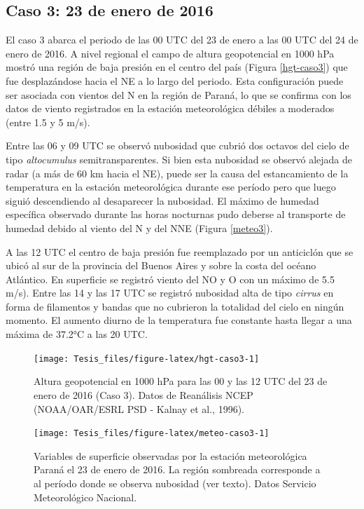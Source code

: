 \documentclass[12pt,spanish,oneside, a4paper]{book}
\begin{document}
\subsection{Caso 3: 23 de enero de
2016}\label{caso-3-23-de-enero-de-2016}

El caso 3 abarca el periodo de las 00 UTC del 23 de enero a las 00 UTC
del 24 de enero de 2016. A nivel regional el campo de altura
geopotencial en 1000 hPa mostró una región de baja presión en el centro
del país (Figura \ref{hgt-caso3}) que fue desplazándose hacia el NE a lo
largo del periodo. Esta configuración puede ser asociada con vientos del
N en la región de Paraná, lo que se confirma con los datos de viento
registrados en la estación meteorológica débiles a moderados (entre 1.5
y 5 m/s).

Entre las 06 y 09 UTC se observó nubosidad que cubrió dos octavos del
cielo de tipo \emph{altocumulus} semitransparentes. Si bien esta
nubosidad se observó alejada de radar (a más de 60 km hacia el NE),
puede ser la causa del estancamiento de la temperatura en la estación
meteorológica durante ese período pero que luego siguió descendiendo al
desaparecer la nubosidad. El máximo de humedad específica observado
durante las horas nocturnas pudo deberse al transporte de humedad debido
al viento del N y del NNE (Figura \ref{meteo3}).

A las 12 UTC el centro de baja presión fue reemplazado por un anticiclón
que se ubicó al sur de la provincia del Buenos Aires y sobre la costa
del océano Atlántico. En superficie se registró viento del NO y O con un
máximo de 5.5 m/s). Entre las 14 y las 17 UTC se registró nubosidad alta
de tipo \emph{cirrus} en forma de filamentos y bandas que no cubrieron
la totalidad del cielo en ningún momento. El aumento diurno de la
temperatura fue constante hasta llegar a una máxima de 37.2°C a las 20
UTC.

\begin{figure}

{\centering \texttt{[image: Tesis\_files/figure-latex/hgt-caso3-1]} 

}

\caption{Altura geopotencial en 1000 hPa para las 00 y las 12 UTC del 23 de enero de 2016 (Caso 3). Datos de Reanálisis NCEP (NOAA/OAR/ESRL PSD - Kalnay et al., 1996). \label{hgt-caso3}}\label{fig:hgt-caso3}
\end{figure}

\begin{figure}

{\centering \texttt{[image: Tesis\_files/figure-latex/meteo-caso3-1]} 

}

\caption{Variables de superficie observadas por la estación meteorológica Paraná el 23 de enero de 2016. La región sombreada corresponde a al período donde se observa nubosidad (ver texto). Datos Servicio Meteorológico Nacional. \label{meteo3}}\label{fig:meteo-caso3}
\end{figure}
\end{document}
